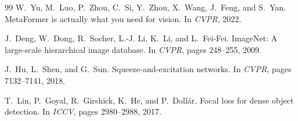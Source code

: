 \documentclass[12pt, a4paper]{report}
\begin{document}
\begin{thebibliography}{99}
W.~Yu, M.~Luo, P.~Zhou, C.~Si, Y.~Zhou, X.~Wang, J.~Feng, and S.~Yan.
\newblock Meta{F}ormer is actually what you need for vision.
\newblock In \emph{CVPR}, 2022.

J.~Deng, W.~Dong, R.~Socher, L.-J. Li, K.~Li, and L.~Fei-Fei.
\newblock Image{N}et: A large-scale hierarchical image database.
\newblock In \emph{CVPR}, pages 248--255, 2009.

J.~Hu, L.~Shen, and G.~Sun.
\newblock Squeeze-and-excitation networks.
\newblock In \emph{CVPR}, pages 7132--7141, 2018.

T.~Lin, P.~Goyal, R.~Girshick, K.~He, and P.~Doll{\'a}r.
\newblock Focal loss for dense object detection.
\newblock In \emph{ICCV}, pages 2980--2988, 2017.

\end{thebibliography}
\end{document}
